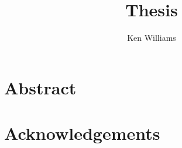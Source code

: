 \documentclass[a4paper]{report}
\title{Thesis}
\author{Ken Williams}
\begin{document}
\newcommand{\method}[1]{\texttt{#1()}}
\newcommand{\class}[1]{\texttt{#1}}

\maketitle

\chapter*{Abstract}
\chapter*{Acknowledgements}

\tableofcontents











\end{document}

